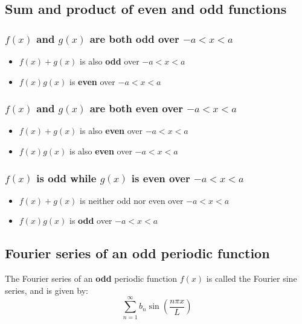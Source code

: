 \documentclass[11pt]{article}
\begin{document}
 \newpage

\subsection{Sum and product of even and odd functions}
\label{sec:org36dfb71}

\subsubsection{\(f(x)\) and \(g(x)\) are both odd over \(- a < x < a\)}
\label{sec:org66be770}
\begin{itemize}
\item \(f(x) + g(x)\) is also \textbf{odd} over \(- a < x < a\)
\item \(f(x) g(x)\) is \textbf{even} over \(- a < x < a\)
\end{itemize}

\subsubsection{\(f(x)\) and \(g(x)\) are both even over \(- a < x < a\)}
\label{sec:org7a75adc}
\begin{itemize}
\item \(f(x) + g(x)\) is also \textbf{even} over \(- a < x < a\)
\item \(f(x) g(x)\) is also \textbf{even} over \(- a < x < a\)
\end{itemize}

\subsubsection{\(f(x)\) is odd while \(g(x)\) is even over \(- a < x < a\)}
\label{sec:org09b7ba6}
\begin{itemize}
\item \(f(x) + g(x)\) is neither odd nor even over \(- a < x < a\)
\item \(f(x) g(x)\) is \textbf{odd} over \(- a < x < a\)
\end{itemize}

 \newpage

\subsection{Fourier series of an odd periodic function}
\label{sec:orgdb698f8}
The Fourier series of an \textbf{odd} periodic function \(f(x)\) is called the Fourier sine series, and is given by:
\[\sum_{n = 1}^{\infty} b_n \sin \left( \frac{n \pi x}{L} \right)\]
\end{document}

